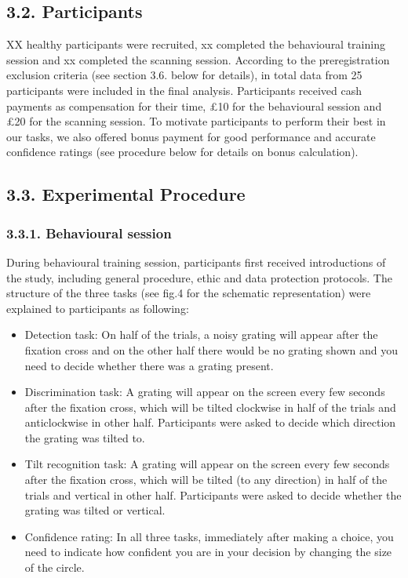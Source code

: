 \documentclass[]{article}
\begin{document}
\hypertarget{participants}{%
\subsection{3.2. Participants}\label{participants}}

XX healthy participants were recruited, xx completed the behavioural
training session and xx completed the scanning session. According to the
preregistration exclusion criteria (see section 3.6. below for details),
in total data from 25 participants were included in the final analysis.
Participants received cash payments as compensation for their time, £10
for the behavioural session and £20 for the scanning session. To
motivate participants to perform their best in our tasks, we also
offered bonus payment for good performance and accurate confidence
ratings (see procedure below for details on bonus calculation).

\hypertarget{experimental-procedure}{%
\subsection{3.3. Experimental Procedure}\label{experimental-procedure}}

\hypertarget{behavioural-session}{%
\subsubsection{3.3.1. Behavioural session}\label{behavioural-session}}

During behavioural training session, participants first received
introductions of the study, including general procedure, ethic and data
protection protocols. The structure of the three tasks (see fig.4 for
the schematic representation) were explained to participants as
following:

\begin{itemize}
\item
  Detection task: On half of the trials, a noisy grating will appear
  after the fixation cross and on the other half there would be no
  grating shown and you need to decide whether there was a grating
  present.
\item
  Discrimination task: A grating will appear on the screen every few
  seconds after the fixation cross, which will be tilted clockwise in
  half of the trials and anticlockwise in other half. Participants were
  asked to decide which direction the grating was tilted to.
\item
  Tilt recognition task: A grating will appear on the screen every few
  seconds after the fixation cross, which will be tilted (to any
  direction) in half of the trials and vertical in other half.
  Participants were asked to decide whether the grating was tilted or
  vertical.
\item
  Confidence rating: In all three tasks, immediately after making a
  choice, you need to indicate how confident you are in your decision by
  changing the size of the circle.
\end{itemize}
\end{document}
